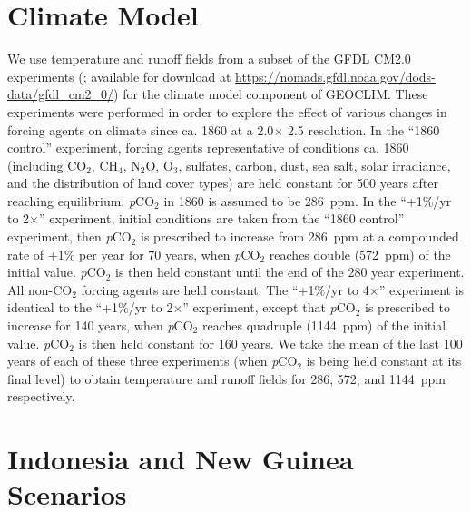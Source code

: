 \documentclass[11pt,letterpaper]{article}
\newcommand{\degrees}{\textdegree\xspace}
\newcommand{\pCOtwo}{\textit{p}CO$_{2}$\xspace}
\newcommand{\COtwo}{CO$_{2}$\xspace}
\begin{document}
\section*{Climate Model}

We use temperature and runoff fields from a subset of the GFDL CM2.0 experiments (\citealp{Delworth2006a, Delworth2006b}; available for download at \url{https://nomads.gfdl.noaa.gov/dods-data/gfdl_cm2_0/}) for the climate model component of GEOCLIM. These experiments were performed in order to explore the effect of various changes in forcing agents on climate since ca. 1860 at a 2.0\degrees $\times$ 2.5\degrees resolution. In the ``1860 control'' experiment, forcing agents representative of conditions ca. 1860 (including \COtwo, CH$_{4}$, N$_{2}$O, O$_{3}$, sulfates, carbon, dust, sea salt, solar irradiance, and the distribution of land cover types) are held constant for 500 years after reaching equilibrium. \pCOtwo in 1860 is assumed to be 286~ppm. In the ``+1\%/yr to 2$\times$'' experiment, initial conditions are taken from the ``1860 control'' experiment, then \pCOtwo is prescribed to increase from 286~ppm at a compounded rate of +1\% per year for 70 years, when \pCOtwo reaches double (572~ppm) of the initial value. \pCOtwo is then held constant until the end of the 280 year experiment. All non-\COtwo forcing agents are held constant. The ``+1\%/yr to 4$\times$'' experiment is identical to the ``+1\%/yr to 2$\times$'' experiment, except that \pCOtwo is prescribed to increase for 140 years, when \pCOtwo reaches quadruple (1144~ppm) of the initial value. \pCOtwo is then held constant for 160 years. We take the mean of the last 100 years of each of these three experiments (when \pCOtwo is being held constant at its final level) to obtain temperature and runoff fields for 286, 572, and 1144~ppm respectively.

\section*{Indonesia and New Guinea Scenarios}
\end{document}
